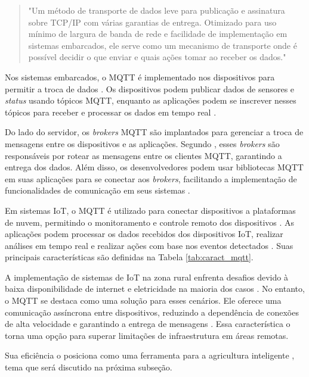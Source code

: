 \begin{quote}
"Um método de transporte de dados leve para publicação e assinatura sobre TCP/IP com várias garantias de entrega. Otimizado para uso mínimo de largura de banda de rede e facilidade de implementação em sistemas embarcados, ele serve como um mecanismo de transporte onde é possível decidir o que enviar e quais ações tomar ao receber os dados." \parencite[{p. 4}]{Andy_mqtt2004}
\end{quote}

Nos sistemas embarcados, o MQTT é implementado nos dispositivos para permitir a troca de dados \parencite{Andy_mqtt2004}. Os dispositivos podem publicar dados de sensores e \textit{status} usando tópicos MQTT, enquanto as aplicações podem se inscrever nesses tópicos para receber e processar os dados em tempo real \parencite{Yassein_mqtt2017}.

Do lado do servidor, os \textit{brokers} MQTT são implantados para gerenciar a troca de mensagens entre os dispositivos e as aplicações. Segundo \textcite{Yassein_mqtt2017}, esses \textit{brokers} são responsáveis por rotear as mensagens entre os clientes MQTT, garantindo a entrega dos dados. Além disso, os desenvolvedores podem usar bibliotecas MQTT em suas aplicações para se conectar aos \textit{brokers}, facilitando a implementação de funcionalidades de comunicação em seus sistemas \parencite{MQTT_org}.

Em sistemas IoT, o MQTT é utilizado para conectar dispositivos a plataformas de nuvem, permitindo o monitoramento e controle remoto dos dispositivos \parencite{junior2022data}. As aplicações podem processar os dados recebidos dos dispositivos IoT, realizar análises em tempo real e realizar ações com base nos eventos detectados \parencite{ferrandez2018precision,hsu2020creative}. Suas principais características são definidas na Tabela \ref{tab:caract_mqtt}.

A implementação de sistemas de IoT na zona rural enfrenta desafios devido à baixa disponibilidade de internet e eletricidade na maioria dos casos \parencite{rijswijk2021digital}. No entanto, o MQTT se destaca como uma solução para esses cenários. Ele oferece uma comunicação assíncrona entre dispositivos, reduzindo a dependência de conexões de alta velocidade e garantindo a entrega de mensagens \parencite{Andy_mqtt2004, Yassein_mqtt2017}. Essa característica o torna uma opção para superar limitações de infraestrutura em áreas remotas. 

Sua eficiência o posiciona como uma ferramenta para a agricultura inteligente \parencite{Gurjeet_smart2022}, tema que será discutido na próxima subseção.

